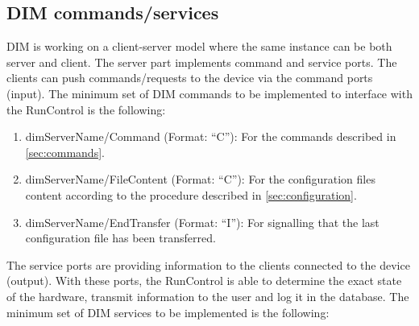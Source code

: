 \documentclass[a4paper]{article}
\begin{document}
\subsection{DIM commands/services} \label{sec:DIM}
DIM is working on a client-server model where the same instance can be both server and client.
The server part implements command and service ports. The clients can push commands/requests to
the device via the command ports (input). The minimum set of DIM commands to be implemented to
interface with the RunControl is the following:
\begin{enumerate}[label=\textbf{CMD.\arabic*}]
	\item \label{cmd:command} dimServerName/Command (Format: ``C''): For the commands described in
	\ref{sec:commands}.
	\item \label{cmd:fileContent} dimServerName/FileContent (Format: ``C''): For the configuration
	files content according to the procedure described in \ref{sec:configuration}.
	\item \label{cmd:endTransfer} dimServerName/EndTransfer (Format: ``I''): For signalling that the
	last configuration file has been transferred.
\end{enumerate}
The service ports are providing information to the clients connected to the device (output).
With these ports, the RunControl is able to determine the exact state of the hardware,
transmit information to the user and log it in the database. The minimum set of DIM services to
be implemented is the following:
\end{document}
